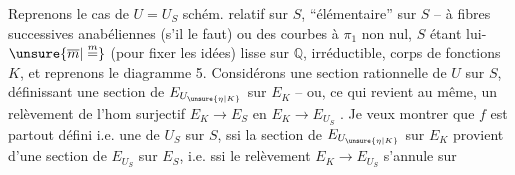 Reprenons le cas de $U=U_S$ schém. relatif sur $S$, ``élémentaire'' sur $S$ -- à fibres successives anabéliennes (s'il le faut) ou des courbes à $\pi_1$ non nul, $S$ étant lui-$\unsure{\overline m|\overset{m}{=}}$ (pour fixer les idées) lisse sur $\mathbb{Q}$, irréductible, corps de fonctions $K$, et reprenons le diagramme 5. Considérons une section rationnelle  de $U$ sur $S$, définissant une section de $E_{U_{\unsure{\eta|K}}}$ sur $E_K$ -- ou, ce qui revient au même, un relèvement de l'hom surjectif $E_K\longrightarrow E_S$ en $E_K\longrightarrow E_{U_S}$ . Je veux montrer que $f$ est partout défini i.e. une   de $U_S$ sur $S$, ssi la section de $E_{U_{\unsure{\eta|K}}}$ sur $E_K$ provient d'une section de $E_{U_S}$ sur $E_S$, i.e. ssi le relèvement $E_K\longrightarrow E_{U_S}$ s'annule sur
